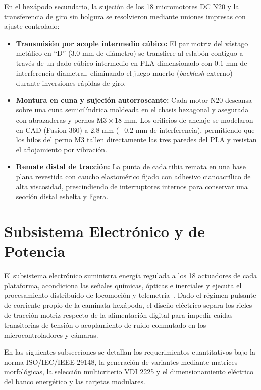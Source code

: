 En el hexápodo secundario, la sujeción de los 18 micromotores DC N20 y la transferencia de giro sin holgura se resolvieron mediante uniones impresas con ajuste controlado:

\begin{itemize}
    \item \textbf{Transmisión por acople intermedio cúbico:} El par motriz del vástago metálico en ``D'' ($3.0\text{ mm}$ de diámetro) se transfiere al eslabón contiguo a través de un dado cúbico intermedio en PLA dimensionado con $0.1\text{ mm}$ de interferencia diametral, eliminando el juego muerto (\textit{backlash} externo) durante inversiones rápidas de giro.
    \item \textbf{Montura en cuna y sujeción autorroscante:} Cada motor N20 descansa sobre una cuna semicilíndrica moldeada en el chasis hexagonal y asegurada con abrazaderas y pernos $\text{M3} \times 18\text{ mm}$. Los orificios de anclaje se modelaron en CAD (Fusion 360) a $2.8\text{ mm}$ ($-0.2\text{ mm}$ de interferencia), permitiendo que los hilos del perno M3 tallen directamente las tres paredes del PLA y resistan el aflojamiento por vibración.
    \item \textbf{Remate distal de tracción:} La punta de cada tibia remata en una base plana revestida con caucho elastomérico fijado con adhesivo cianoacrílico de alta viscosidad, prescindiendo de interruptores internos para conservar una sección distal esbelta y ligera.
\end{itemize}

\section{Subsistema Electrónico y de Potencia}

El subsistema electrónico suministra energía regulada a los 18 actuadores de cada plataforma, acondiciona las señales químicas, ópticas e inerciales y ejecuta el procesamiento distribuido de locomoción y telemetría~\cite{AdvancesMining_2023, Sensors2021_HexapodReview}. Dado el régimen pulsante de corriente propio de la caminata hexápoda, el diseño eléctrico separa los rieles de tracción motriz respecto de la alimentación digital para impedir caídas transitorias de tensión o acoplamiento de ruido conmutado en los microcontroladores y cámaras.

En las siguientes subsecciones se detallan los requerimientos cuantitativos bajo la norma ISO/IEC/IEEE 29148, la generación de variantes mediante matrices morfológicas, la selección multicriterio VDI 2225 y el dimensionamiento eléctrico del banco energético y las tarjetas modulares.

